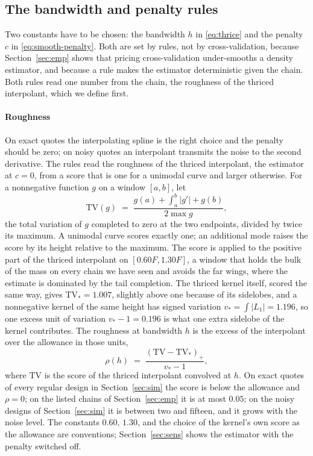 \documentclass[preprint,12pt,authoryear,times]{elsarticle}
\newcommand{\TV}{\mathrm{TV}}
\begin{document}
\subsection{The bandwidth and penalty rules}
\label{sec:rules}

Two constants have to be chosen: the bandwidth \(h\) in \eqref{eq:thrice} and the penalty \(c\) in \eqref{eq:smooth-penalty}. Both are set by rules, not by cross-validation, because Section~\ref{sec:emp} shows that pricing cross-validation under-smooths a density estimator, and because a rule makes the estimator deterministic given the chain. Both rules read one number from the chain, the roughness of the thriced interpolant, which we define first.

\paragraph{Roughness}
On exact quotes the interpolating spline is the right choice and the penalty should be zero; on noisy quotes an interpolant transmits the noise to the second derivative. The rules read the roughness of the thriced interpolant, the estimator at \(c=0\), from a score that is one for a unimodal curve and larger otherwise. For a nonnegative function \(g\) on a window \([a,b]\), let
\begin{equation}
\label{eq:tv}
\TV(g)\;=\;\frac{g(a)+\int_a^b|g'|+g(b)}{2\max g},
\end{equation}
the total variation of \(g\) completed to zero at the two endpoints, divided by twice its maximum. A unimodal curve scores exactly one; an additional mode raises the score by its height relative to the maximum. The score is applied to the positive part of the thriced interpolant on \([0.60F,1.30F]\), a window that holds the bulk of the mass on every chain we have seen and avoids the far wings, where the estimate is dominated by the tail completion. The thriced kernel itself, scored the same way, gives \(\TV_*=1.007\), slightly above one because of its sidelobes, and a nonnegative kernel of the same height has signed variation \(v_*=\int|L_1|=1.196\), so one excess unit of variation \(v_*-1=0.196\) is what one extra sidelobe of the kernel contributes. The roughness at bandwidth \(h\) is the excess of the interpolant over the allowance in those units,
\begin{equation}
\label{eq:rho}
\rho(h)\;=\;\frac{(\TV-\TV_*)_+}{v_*-1},
\end{equation}
where \(\TV\) is the score of the thriced interpolant convolved at \(h\). On exact quotes of every regular design in Section~\ref{sec:sim} the score is below the allowance and \(\rho=0\); on the listed chains of Section~\ref{sec:emp} it is at most \(0.05\); on the noisy designs of Section~\ref{sec:sim} it is between two and fifteen, and it grows with the noise level. The constants \(0.60\), \(1.30\), and the choice of the kernel's own score as the allowance are conventions; Section~\ref{sec:sens} shows the estimator with the penalty switched off.
\end{document}
